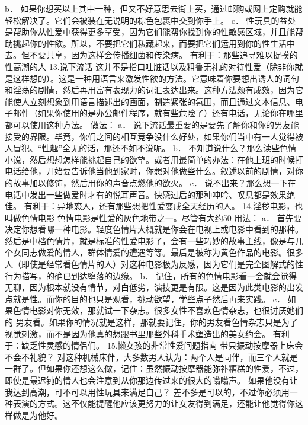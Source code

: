 \documentclass[12pt,UTF8]{ctexbook}
\begin{document}
b． 如果你想买以上其中一种，但又不好意思去街上买，通过邮购或网上定购就能轻松解决了。它们会被装在无说明的棕色包裹中交到你手上。
c． 性玩具的益处是帮助你从性爱中获得更多享受，因为它们能帮你找到你的性敏感区域，并且能帮助挑起你的性欲。所以，不要把它们私藏起来，而要把它们运用到你的性生活中去。但不要共享，因为这样会传播细菌和传染病。
有利于：那些追寻难以捉摸的性高潮的人
13.说下流话
这并不是指口吐脏话以及粗鲁无礼的对待性爱（除非你就是这样想的）。这是一种用语言来激发性欲的方法。它意味着你要想出诱人的词句和淫荡的剧情，然后再用富有表现力的词汇表达出来。这种方法颇有成效，因为它能使人立刻想象到用语言描述出的画面，制造紧张的氛围，而且通过文本信息、电子邮件（如果你使用的是办公邮件程序，就有些危险了）还有电话，无论你在哪里都可以使用这种方法。
做法：
a． 说下流话最重要的是要先了解你和你的男友能接受的界限。毕竟，你们之间的相互竞争没什么好处，如果你们当中有一人觉得被人冒犯、“性趣”全无的话，那还不如不说呢。
b． 不知道说什么？那么读些色情小说，然后想想怎样能挑起自己的欲望。或者用最简单的办法：在他上班的时候打电话给他，开始要告诉他当他到家时，你想对他做些什么。叙述以前的剧情，对你的故事加以修饰，然后用你的声音点燃他的欲火。
c． 说不出来？那么想一下在电话中发出一些做爱时才有的悦耳声音。快感过后的那种呻吟、叹息都是效果绝佳。
有利于：异地恋人，还有那些想把性爱变成全天经历的人。
14.淫秽电影，也叫做色情电影
色情电影是性爱的灰色地带之一。尽管有大约50%
用法：
a． 首先要决定你想看哪一种电影。轻度色情片大概就是你会在电视上或电影中看到的那种。然后是中档色情片，就是标准的性爱电影了，会有一些巧妙的故事主线，像是与几个女同志做爱的情人，群体情爱的遭遇等等。最后是被称为黄色作品的电影。很多人（即使是经常看色情片的人）对这种电影极为反感，因为它们是完全图解式的性行为描写，的确已到达堕落的边缘。
b． 记住，所有的色情电影看一会就会觉得无聊，因为根本就没有情节，对白低劣，演技更是有限。这是因为此类电影的出发点就是性。而你的目的也只是观看，挑动欲望，学些点子然后再来实践。
c． 如果色情电影对你无效，那就试一下杂志。很多女性不喜欢色情杂志，也很讨厌她们的
男友看。如果你的情况就是这样，那就要记住，你的男友看色情杂志只是为了视觉刺激，而不是因为他真的想跟书里那些外科手术塑造出的美女约会。
有利于：缺乏性灵感的情侣们。
15.懒女孩的非常性爱问题指南
带只振动按摩器上床会不会不礼貌？
对这种机械床伴，大多数男人认为：两个人是同伴，而三个人就是一群了。但如果你还想这么做，记住：虽然振动按摩器能弥补糟糕的性爱，不过，即使是最迟钝的情人也会注意到从你那边传过来的很大的嗡嗡声。
如果他没有让我达到高潮，可不可以用性玩具来满足自己？
差不多是可以的，不过你必须用一种表演的方式。这不仅能提醒他应该更努力的让女友得到满足，还能让他觉得你这样做是为他好。
\end{document}
